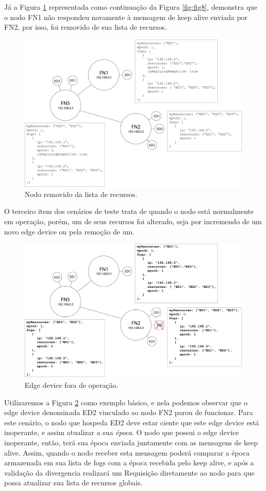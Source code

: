 Já a Figura \ref{fig:fig9} representada como continuação da Figura \ref{fig:fig8}, demonstra que o nodo FN1 não respondeu novamente à mensagem de keep alive enviada por FN2, por isso, foi removido de sua lista de recursos. 

\begin{figure}[h!]
    \centering\includegraphics[width=.8\textwidth]{fig9.png}
    \caption [Nodo removido da lista de recursos]
    {\label{fig:fig9} Nodo removido da lista de recursos.}
\end{figure}

O terceiro item dos cenários de teste trata de quando o nodo está normalmente em operação, porém, um de seus recursos foi alterado, seja por incremendo de um novo edge device ou
pela remoção de um.

\begin{figure}[H]
    \centering\includegraphics[width=.8\textwidth]{fig10.png} 
    \caption[Edge device fora de operação]
    {\label{fig:fig10} Edge device fora de operação.}
\end{figure}

Utilizaremos a Figura \ref{fig:fig10} como exemplo básico, e nela podemos observar que o edge device denominada ED2 vinculado ao nodo FN2 parou de funcionar.
Para este cenário, o nodo que hospeda ED2 deve estar ciente que este edge device está inoperante, e assim atualizar a sua \textit{época}.
O nodo que possui o edge device inoperante, então, terá sua época enviada juntamente com as mensagens de keep alive.
Assim, quando o nodo receber esta mensagem poderá comparar a época armazenada em sua lista de fogs com a época recebida pelo keep alive, e após a validação da divergencia realizará
um Requisição diretamente ao nodo para que possa atualizar sua lista de recursos globais.

